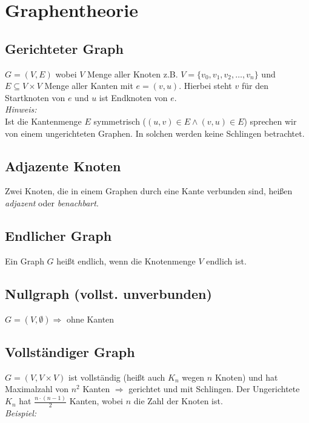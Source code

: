 \section{Graphentheorie}
\subsection*{Gerichteter Graph}
$G=(V,E)$ wobei $V$ Menge aller Knoten z.B. $V=\{v_0,v_1,v_2,\dots,v_n\}$ und $E\subseteq V\times V$ Menge aller Kanten mit $e=(v,u)$. Hierbei steht $v$ für den Startknoten von $e$ und $u$ ist Endknoten von $e$.\\
\emph{Hinweis:}\\
Ist die Kantenmenge $E$ symmetrisch ($(u,v)\in E\wedge (v,u)\in E$) sprechen wir von einem ungerichteten Graphen. In solchen werden keine Schlingen betrachtet.
\subsection*{Adjazente Knoten}
Zwei Knoten, die in einem Graphen durch eine Kante verbunden sind, heißen \emph{adjazent} oder \emph{benachbart}.
\subsection*{Endlicher Graph}
Ein Graph $G$ heißt endlich, wenn die Knotenmenge $V$ endlich ist.
\subsection*{Nullgraph (vollst. unverbunden)}
$G=(V,\emptyset)\Rightarrow$ ohne Kanten
\subsection*{Vollständiger Graph}
$G=(V,V\times V)$ ist vollständig (heißt auch $K_n$ wegen $n$ Knoten) und hat Maximalzahl von $n^2$ Kanten $\Rightarrow$ gerichtet und mit Schlingen. Der Ungerichtete $K_n$ hat $\frac{n\cdot (n-1)}{2}$ Kanten, wobei $n$ die Zahl der Knoten ist.\\
\emph{Beispiel:}\\
